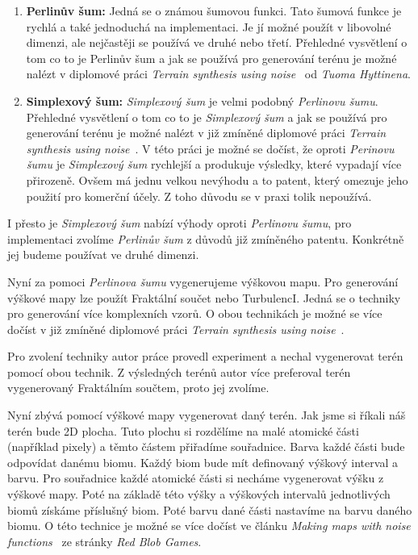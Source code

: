 \begin{enumerate}
    \item \textbf{Perlinův šum:} Jedná se o známou šumovou funkci. Tato šumová funkce je rychlá a také jednoduchá na implementaci. Je jí možné použít v libovolné dimenzi, ale nejčastěji se používá ve druhé nebo třetí. Přehledné vysvětlení o tom co to je Perlinův šum a jak se používá pro generování terénu je možné nalézt v diplomové práci \textit{Terrain synthesis using noise}~\cite{TerrainNoise} od \textit{Tuoma Hyttinena}.

    \item \textbf{Simplexový šum:} \textit{Simplexový šum} je velmi podobný \textit{Perlinovu šumu}. Přehledné vysvětlení o tom co to je \textit{Simplexový šum} a jak se používá pro generování terénu je možné nalézt v již zmíněné diplomové práci \textit{Terrain synthesis using noise}~\cite{TerrainNoise}. V této práci je možné se dočíst, že oproti \textit{Perinovu šumu} je \textit{Simplexový šum} rychlejší a produkuje výsledky, které vypadají více přirozeně. Ovšem má jednu velkou nevýhodu a to patent, který omezuje jeho použití pro komerční účely. Z toho důvodu se v praxi tolik nepoužívá.
\end{enumerate}

I přesto je \textit{Simplexový šum} nabízí výhody oproti \textit{Perlinovu šumu}, pro implementaci zvolíme \textit{Perlinův šum} z důvodů již zmíněného patentu. Konkrétně jej budeme používat ve druhé dimenzi.

Nyní za pomoci \textit{Perlinova šumu} vygenerujeme výškovou mapu. Pro generování výškové mapy lze použít Fraktální součet nebo TurbulencI. Jedná se o techniky pro generování více komplexních vzorů. O obou technikách je možné se více dočíst v již zmíněné diplomové práci \textit{Terrain synthesis using noise}~\cite{TerrainNoise}.

Pro zvolení techniky autor práce provedl experiment a nechal vygenerovat terén pomocí obou technik. Z výsledných terénů autor více preferoval terén vygenerovaný Fraktálním součtem, proto jej zvolíme.

Nyní zbývá pomocí výškové mapy vygenerovat daný terén. Jak jsme si říkali náš terén bude 2D plocha. Tuto plochu si rozdělíme na malé atomické části (například pixely) a těmto částem přiřadíme souřadnice. Barva každé části bude odpovídat danému biomu. Každý biom bude mít definovaný výškový interval a barvu. Pro souřadnice každé atomické části si necháme vygenerovat výšku z výškové mapy. Poté na základě této výšky a výškových intervalů jednotlivých biomů získáme příslušný biom. Poté barvu dané části nastavíme na barvu daného biomu. O této technice je možné se více dočíst ve článku \textit{Making maps with noise functions}~\cite{TerrainHeightMap} ze stránky \textit{Red Blob Games}.

